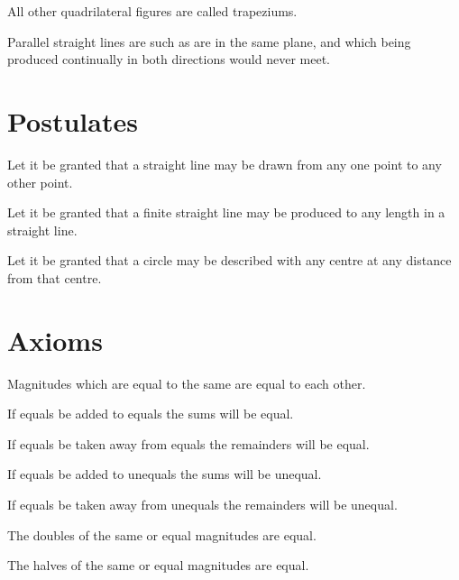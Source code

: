 \startdefinition{}\label{def:I.XXXIV}
\begin{center}
All other quadrilateral figures are called trapeziums.
\end{center}


\startdefinition{}\label{def:I.XXXV}
\begin{center}
\drawCurrentPictureInMargin[inside] Parallel straight lines are such as are in the same plane, and which being produced continually in both directions would never meet.
\end{center}

\chapter*{Postulates}

\startpostulate{}\label{post:I.I}
Let it be granted that a straight line may be drawn from any one point to any other point.

\startpostulate{}\label{post:I.II}
Let it be granted that a finite straight line may be produced to any length in a straight line.

\startpostulate{}\label{post:I.III}
Let it be granted that a circle may be described with any centre at any distance from that centre.

\chapter*{Axioms}

\startaxiom{}\label{ax:I.I}
Magnitudes which are equal to the same are equal to each other.


\startaxiom{}\label{ax:I.II}
If equals be added to equals the sums will be equal.


\startaxiom{}\label{ax:I.III}
If equals be taken away from equals the remainders will be equal.


\startaxiom{}\label{ax:I.IV}
If equals be added to unequals the sums will be unequal.


\startaxiom{}\label{ax:I.V}
If equals be taken away from unequals the remainders will be unequal.


\startaxiom{}\label{ax:I.VI}
The doubles of the same or equal magnitudes are equal.


\startaxiom{}\label{ax:I.VII}
The halves of the same or equal magnitudes are equal.


